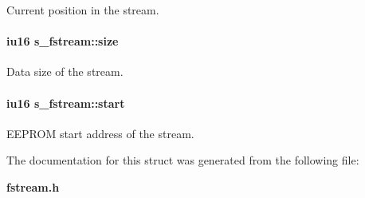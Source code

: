 Current position in the stream. 

\paragraph{\setlength{\rightskip}{0pt plus 5cm}\bf{iu16} \bf{s\_\-fstream::size}}\hfill\label{structs__fstream_b803d160e579a1969b9803f19b7a0814}


Data size of the stream. 

\paragraph{\setlength{\rightskip}{0pt plus 5cm}\bf{iu16} \bf{s\_\-fstream::start}}\hfill\label{structs__fstream_4427473894e909d279b9fb12fba358e5}


EEPROM start address of the stream. 



The documentation for this struct was generated from the following file:\begin{CompactItemize}
\item 
\bf{fstream.h}\end{CompactItemize}
